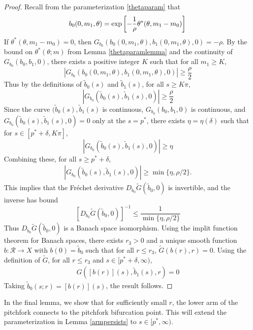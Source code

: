 \documentclass[thesis.tex]{subfiles}
\begin{document}
\begin{lemma}
\begin{proof}
Recall from the parameterization \cref{thetaparam} that 
\[
b_0( 0, m_1, \theta) = \exp\left[ -\frac{1}{\rho}\theta^*(\theta, m_1 - m_0) \right] \\
\]
If $\theta^*(\theta, m_1 - m_0) = 0$, then $G_{b_0}(b_0( 0, m_1, \theta), b_1( 0, m_1, \theta), 0) = -\rho$. By the bound on $\theta^*(\theta; m)$ from Lemma \ref{thetaparamlemma} and the continuity of $G_{b_0}(b_0, b_1, 0)$, there exists a positive integer $K$ such that for all $m_1 \geq K$,
\[
|G_{b_0}(b_0( 0, m_1, \theta), b_1( 0, m_1, \theta), 0)| \geq \frac{\rho}{2} 
\]
Thus by the definitions of $\tilde{b}_0(s)$ and $\tilde{b}_1(s)$, for all $s \geq K \pi$,
\[
|G_{b_0}(\tilde{b}_0(s), \tilde{b}_1(s), 0)| \geq \frac{\rho}{2} 
\]
Since the curve $(\tilde{b}_0(s), \tilde{b}_1(s)$ is continuous, $G_{b_0}(b_0, b_1, 0)$ is continuous,  and $G_{b_0}(\tilde{b}_0(s), \tilde{b}_1(s), 0) = 0$ only at the $s = p^*$, there exists $\eta = \eta(\delta)$ such that for $s \in [p^* + \delta, K \pi]$,
\[
|G_{b_0}(\tilde{b}_0(s), \tilde{b}_1(s), 0)| \geq \eta
\]
Combining these, for all $s \geq p^* + \delta$,
\begin{align*}
|G_{b_0}( \tilde{b}_0(s), \tilde{b}_1(s), 0)| \geq \min\{ \eta, \rho/2\}.  
\end{align*}
This implies that the Fr\'echet derivative $D_{b_0} \tilde{G}(\tilde{b}_0, 0)$ is invertible, and the inverse has bound
\[
[D_{b_0} \tilde{G}(\tilde{b}_0, 0)]^{-1} \leq \frac{1}{\min\{ \eta, \rho/2\}}
\]
Thus $D_{b_0} \tilde{G}(\tilde{b}_0, 0)$ is a Banach space isomorphism. Using the implit function theorem for Banach spaces, there exists $r_3 > 0$ and a unique smooth function $b: \mathcal{R} \rightarrow X$ with $b(0) = \tilde{b}_0$ such that for all $r \leq r_3$, $\tilde{G}(b(r), r) = 0$. Using the definition of $\tilde{G}$, for all $r \leq r_3$ and $s \in [p^* + \delta, \infty)$,
\begin{align*}
G([b(r)](s), \tilde{b}_1(s), r) = 0
\end{align*}
Taking $\tilde{b}_0(s; r) = [b(r)](s)$, the result follows.
\end{proof}
\end{lemma} 

In the final lemma, we show that for sufficiently small $r$, the lower arm of the pitchfork connects to the pitchfork bifurcation point. This will extend the parameterization in Lemma \ref{armpersists} to $s \in [p^*, \infty)$.
\end{document}
